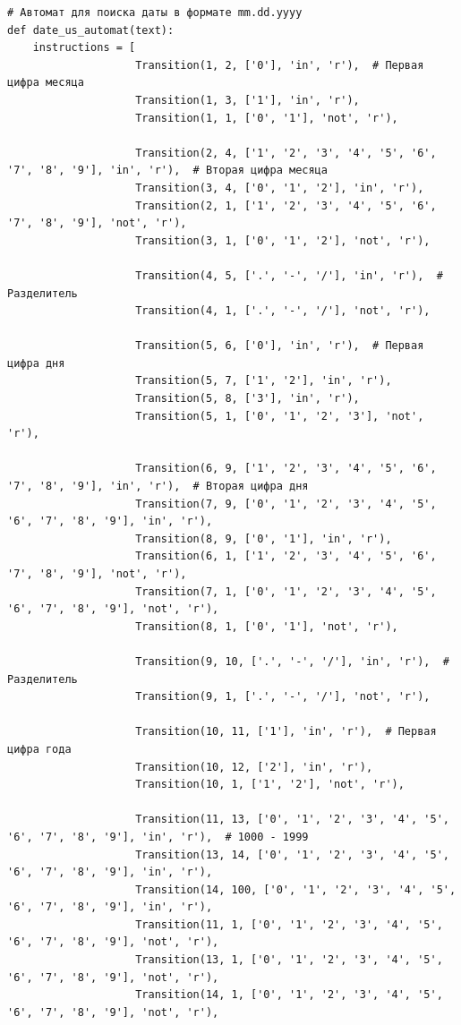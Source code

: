 \documentclass[a4paper, 14pt]{article}
\begin{document}
		\begin{lstlisting}[label=some-code,caption=Автомат для поиска даты в формате mm.dd.yyyy]
		# Автомат для поиска даты в формате mm.dd.yyyy
def date_us_automat(text):
    instructions = [
                    Transition(1, 2, ['0'], 'in', 'r'),  # Первая цифра месяца
                    Transition(1, 3, ['1'], 'in', 'r'),
                    Transition(1, 1, ['0', '1'], 'not', 'r'),

                    Transition(2, 4, ['1', '2', '3', '4', '5', '6', '7', '8', '9'], 'in', 'r'),  # Вторая цифра месяца
                    Transition(3, 4, ['0', '1', '2'], 'in', 'r'),
                    Transition(2, 1, ['1', '2', '3', '4', '5', '6', '7', '8', '9'], 'not', 'r'),
                    Transition(3, 1, ['0', '1', '2'], 'not', 'r'),

                    Transition(4, 5, ['.', '-', '/'], 'in', 'r'),  # Разделитель
                    Transition(4, 1, ['.', '-', '/'], 'not', 'r'),

                    Transition(5, 6, ['0'], 'in', 'r'),  # Первая цифра дня
                    Transition(5, 7, ['1', '2'], 'in', 'r'),
                    Transition(5, 8, ['3'], 'in', 'r'),
                    Transition(5, 1, ['0', '1', '2', '3'], 'not', 'r'),

                    Transition(6, 9, ['1', '2', '3', '4', '5', '6', '7', '8', '9'], 'in', 'r'),  # Вторая цифра дня
                    Transition(7, 9, ['0', '1', '2', '3', '4', '5', '6', '7', '8', '9'], 'in', 'r'),
                    Transition(8, 9, ['0', '1'], 'in', 'r'),
                    Transition(6, 1, ['1', '2', '3', '4', '5', '6', '7', '8', '9'], 'not', 'r'),
                    Transition(7, 1, ['0', '1', '2', '3', '4', '5', '6', '7', '8', '9'], 'not', 'r'),
                    Transition(8, 1, ['0', '1'], 'not', 'r'),

                    Transition(9, 10, ['.', '-', '/'], 'in', 'r'),  # Разделитель
                    Transition(9, 1, ['.', '-', '/'], 'not', 'r'),

                    Transition(10, 11, ['1'], 'in', 'r'),  # Первая цифра года
                    Transition(10, 12, ['2'], 'in', 'r'),
                    Transition(10, 1, ['1', '2'], 'not', 'r'),

                    Transition(11, 13, ['0', '1', '2', '3', '4', '5', '6', '7', '8', '9'], 'in', 'r'),  # 1000 - 1999
                    Transition(13, 14, ['0', '1', '2', '3', '4', '5', '6', '7', '8', '9'], 'in', 'r'),
                    Transition(14, 100, ['0', '1', '2', '3', '4', '5', '6', '7', '8', '9'], 'in', 'r'),
                    Transition(11, 1, ['0', '1', '2', '3', '4', '5', '6', '7', '8', '9'], 'not', 'r'),
                    Transition(13, 1, ['0', '1', '2', '3', '4', '5', '6', '7', '8', '9'], 'not', 'r'),
                    Transition(14, 1, ['0', '1', '2', '3', '4', '5', '6', '7', '8', '9'], 'not', 'r'),


\end{lstlisting}
\end{document}
